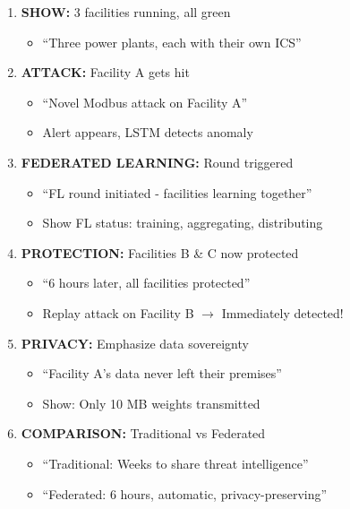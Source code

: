 \documentclass[11pt,a4paper]{article}
\begin{document}
\begin{enumerate}[leftmargin=*]
    \item \textbf{SHOW:} 3 facilities running, all green
    \begin{itemize}
        \item ``Three power plants, each with their own ICS''
    \end{itemize}
    
    \item \textbf{ATTACK:} Facility A gets hit
    \begin{itemize}
        \item ``Novel Modbus attack on Facility A''
        \item Alert appears, LSTM detects anomaly
    \end{itemize}
    
    \item \textbf{FEDERATED LEARNING:} Round triggered
    \begin{itemize}
        \item ``FL round initiated - facilities learning together''
        \item Show FL status: training, aggregating, distributing
    \end{itemize}
    
    \item \textbf{PROTECTION:} Facilities B \& C now protected
    \begin{itemize}
        \item ``6 hours later, all facilities protected''
        \item Replay attack on Facility B $\rightarrow$ Immediately detected!
    \end{itemize}
    
    \item \textbf{PRIVACY:} Emphasize data sovereignty
    \begin{itemize}
        \item ``Facility A's data never left their premises''
        \item Show: Only 10 MB weights transmitted
    \end{itemize}
    
    \item \textbf{COMPARISON:} Traditional vs Federated
    \begin{itemize}
        \item ``Traditional: Weeks to share threat intelligence''
        \item ``Federated: 6 hours, automatic, privacy-preserving''
    \end{itemize}
\end{enumerate}
\end{document}
